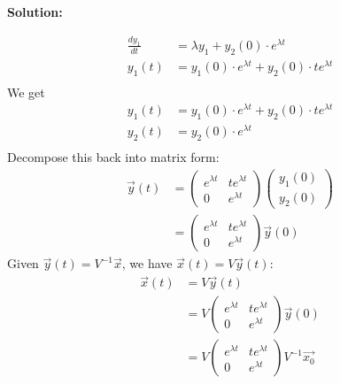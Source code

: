 \documentclass[12pt]{article}
\newenvironment{solution}{
    \textbf{Solution:}
    
}{
    
    \vspace{2em}
}
\begin{document}
\begin{solution}
\[\begin{aligned}
            \frac{dy_1}{dt} &= \lambda y_1 + y_2(0) \cdot e^{\lambda t} \\
            y_1(t) &= y_1(0) \cdot e^{\lambda t} + y_2(0) \cdot t e^{\lambda t} \\
        \end{aligned}
    \]
    We get
    \[
        \begin{aligned}
            y_1(t) &= y_1(0) \cdot e^{\lambda t} + y_2(0) \cdot t e^{\lambda t} \\
            y_2(t) &= y_2(0) \cdot e^{\lambda t}\\
        \end{aligned}
    \]
    Decompose this back into matrix form:
    \[
        \begin{aligned}
            \vec{y}(t) &= \begin{pmatrix}
                e^{\lambda t} & t e^{\lambda t} \\
                0 & e^{\lambda t}
            \end{pmatrix} \begin{pmatrix}
                y_1(0) \\
                y_2(0)
            \end{pmatrix}\\
            &= \begin{pmatrix}
                e^{\lambda t} & t e^{\lambda t} \\
                0 & e^{\lambda t}
            \end{pmatrix} \vec{y}(0)
        \end{aligned}
    \]
    Given \(\vec{y}(t) = V^{-1}\vec{x}\), we have \(\vec{x}(t) = V\vec{y}(t)\):
    \[
        \begin{aligned}
            \vec{x}(t) &= V\vec{y}(t) \\
            &= V\begin{pmatrix}
                e^{\lambda t} & t e^{\lambda t} \\
                0 & e^{\lambda t}
            \end{pmatrix}\vec{y}(0) \\
            &= V\begin{pmatrix}
                e^{\lambda t} & t e^{\lambda t} \\
                0 & e^{\lambda t}
            \end{pmatrix}V^{-1}\vec{x_0}
        \end{aligned}
    \]
\end{solution}
\end{document}
